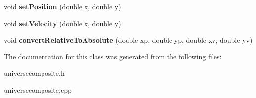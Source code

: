 \begin{DoxyCompactItemize}
\item 
void {\bfseries set\+Position} (double x, double y)\hypertarget{classUniverseComposite_ade4bd314e57e8b30bd33f7c3f164edef}{}\label{classUniverseComposite_ade4bd314e57e8b30bd33f7c3f164edef}

\item 
void {\bfseries set\+Velocity} (double x, double y)\hypertarget{classUniverseComposite_a1dcbef25b73e189934e6cccb0bc2ef2e}{}\label{classUniverseComposite_a1dcbef25b73e189934e6cccb0bc2ef2e}

\item 
void {\bfseries convert\+Relative\+To\+Absolute} (double xp, double yp, double xv, double yv)\hypertarget{classUniverseComposite_a0410ce4d77d4b408148a9f51647d223f}{}\label{classUniverseComposite_a0410ce4d77d4b408148a9f51647d223f}

\end{DoxyCompactItemize}


The documentation for this class was generated from the following files\+:\begin{DoxyCompactItemize}
\item 
universecomposite.\+h\item 
universecomposite.\+cpp\end{DoxyCompactItemize}
